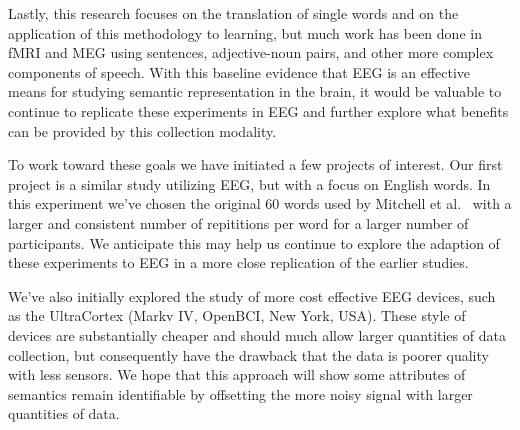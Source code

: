 Lastly, this research focuses on the translation of single words and on the 
application of this methodology to learning, but much work has been done in 
fMRI and MEG using sentences, adjective-noun pairs, and other more complex 
components of speech. With this baseline evidence that EEG is an effective 
means for studying semantic representation in the brain, it would be valuable 
to continue to replicate these experiments in EEG and further explore what 
benefits can be provided by this collection modality.

To work toward these goals we have initiated a few projects of interest. Our 
first project is a similar study utilizing EEG, but with a focus on English 
words. In this experiment we've chosen the original 60 words used by Mitchell 
et al.~\cite{Mitchell2008} with a larger and consistent number of repititions 
per word for a larger number of participants.  We anticipate this may help us 
continue to explore the adaption of these experiments to EEG in a more close 
replication of the earlier studies.

We've also initially explored the study of more cost effective EEG devices, 
such as the UltraCortex (Markv IV, OpenBCI, New York, USA). These style of 
devices are substantially cheaper and should much allow larger quantities of 
data collection, but consequently have the drawback that the data is poorer 
quality with less sensors.  We hope that this approach will show some 
attributes of semantics remain identifiable by offsetting the more noisy signal 
with larger quantities of data.
